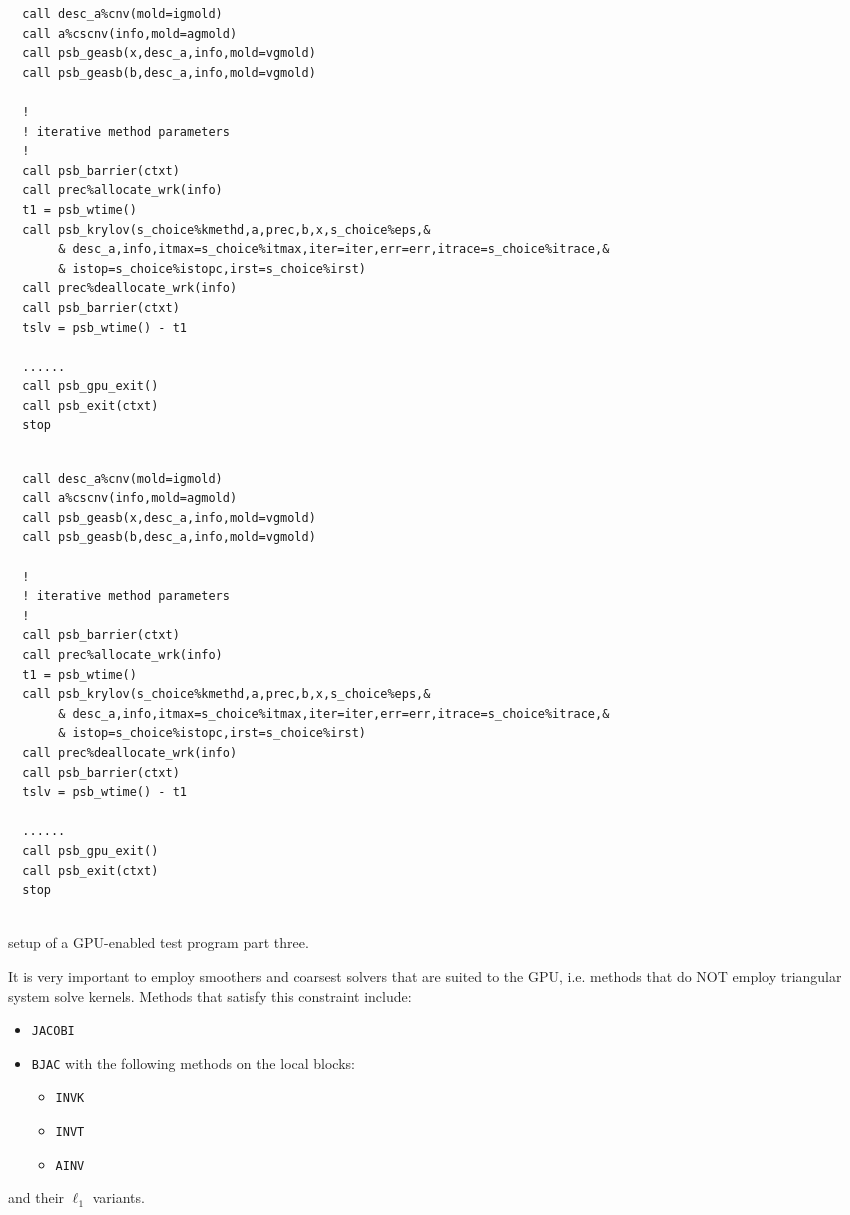 \begin{listing}[h!]
\ifpdf
\begin{verbatim}
  call desc_a%cnv(mold=igmold)
  call a%cscnv(info,mold=agmold)
  call psb_geasb(x,desc_a,info,mold=vgmold)
  call psb_geasb(b,desc_a,info,mold=vgmold)

  !
  ! iterative method parameters
  !
  call psb_barrier(ctxt)
  call prec%allocate_wrk(info)
  t1 = psb_wtime()
  call psb_krylov(s_choice%kmethd,a,prec,b,x,s_choice%eps,&
       & desc_a,info,itmax=s_choice%itmax,iter=iter,err=err,itrace=s_choice%itrace,&
       & istop=s_choice%istopc,irst=s_choice%irst)
  call prec%deallocate_wrk(info)
  call psb_barrier(ctxt)
  tslv = psb_wtime() - t1

  ......
  call psb_gpu_exit()
  call psb_exit(ctxt)
  stop
  

\end{verbatim}
\else
\begin{center}
\begin{minipage}{.90\textwidth}
{\small
\begin{verbatim}
  call desc_a%cnv(mold=igmold)
  call a%cscnv(info,mold=agmold)
  call psb_geasb(x,desc_a,info,mold=vgmold)
  call psb_geasb(b,desc_a,info,mold=vgmold)

  !
  ! iterative method parameters
  !
  call psb_barrier(ctxt)
  call prec%allocate_wrk(info)
  t1 = psb_wtime()
  call psb_krylov(s_choice%kmethd,a,prec,b,x,s_choice%eps,&
       & desc_a,info,itmax=s_choice%itmax,iter=iter,err=err,itrace=s_choice%itrace,&
       & istop=s_choice%istopc,irst=s_choice%irst)
  call prec%deallocate_wrk(info)
  call psb_barrier(ctxt)
  tslv = psb_wtime() - t1

  ......
  call psb_gpu_exit()
  call psb_exit(ctxt)
  stop
  
 \end{verbatim}
}
\end{minipage}
\end{center}
\fi
\caption{setup of a GPU-enabled test program part three.\label{fig:gpu-ex3}}
\end{listing}

It is very important to employ smoothers and coarsest solvers that are suited
to the GPU, i.e.  methods that do NOT employ triangular
system solve kernels. Methods that satisfy this constraint include:
\begin{itemize}
\item \verb|JACOBI|
\item \verb|BJAC| with the following methods on the local blocks:
\begin{itemize}
\item \verb|INVK|
\item \verb|INVT|
\item \verb|AINV|
\end{itemize}
\end{itemize}
and their $\ell_1$ variants. 

